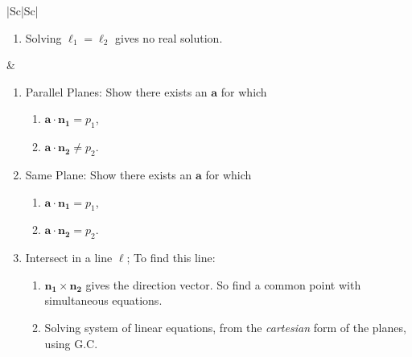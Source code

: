 \documentclass[oneside]{book}
\begin{document}
\begin{longtable}{|Sc|Sc|}
\begin{minipage}{0.5\textwidth}
\begin{enumerate}
\begin{enumerate}
      \item Solving \(\ell_1=\ell_2\) gives no real solution. 
    \end{enumerate}
  \end{enumerate}
\end{minipage} &
\begin{minipage}{0.5\textwidth}
  \begin{enumerate}
    \item Parallel Planes: Show there exists an \(\mathbf{a}\) for which
    \begin{enumerate}
      \item \(\mathbf{a}\cdot \mathbf{n_1}= p_1\),
      \item \(\mathbf{a}\cdot \mathbf{n_2}\neq p_2\).
    \end{enumerate}
    \item Same Plane: Show there exists an \(\mathbf{a}\) for which
    \begin{enumerate}
      \item \(\mathbf{a}\cdot \mathbf{n_1}= p_1\),
      \item \(\mathbf{a}\cdot \mathbf{n_2}= p_2\).
    \end{enumerate}
    \item Intersect in a line \(\ell\); To find this line:
    \begin{enumerate}[label=M\arabic*:]
      \item \(\mathbf{n_1}\times \mathbf{n_2}\) gives the direction vector. So find a common point with simultaneous equations.
      \item Solving system of linear equations, from the \emph{cartesian} form of the planes, using G.C.
    \end{enumerate}
  \end{enumerate}
\end{minipage}\\
\hline
{}\\
\hline 
{}
\end{longtable}
\end{document}
